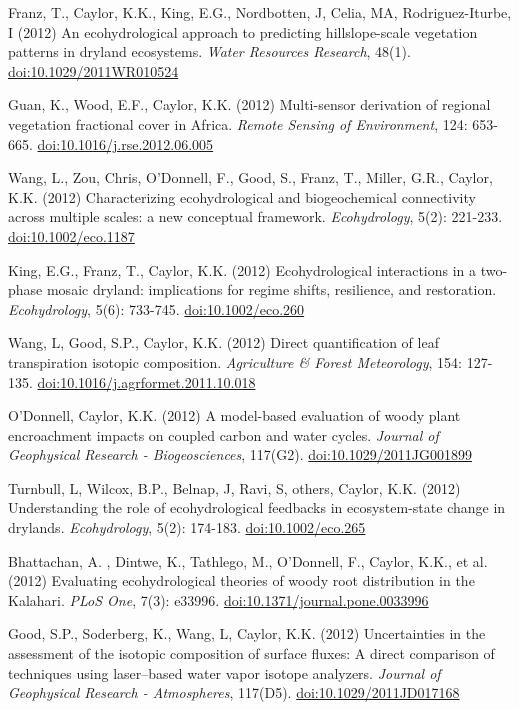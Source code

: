 \begin{etaremune}
\item Franz, T., Caylor, K.K., King, E.G., Nordbotten, J, Celia, MA, Rodriguez-Iturbe, I (2012) An ecohydrological approach to predicting hillslope-scale vegetation patterns in dryland ecosystems. \emph{Water Resources Research}, 48(1). \href{https://doi.org/10.1029/2011WR010524}{doi:10.1029/2011WR010524}
\item Guan, K., Wood, E.F., Caylor, K.K. (2012) Multi-sensor derivation of regional vegetation fractional cover in Africa. \emph{Remote Sensing of Environment}, 124: 653-665. \href{https://doi.org/10.1016/j.rse.2012.06.005}{doi:10.1016/j.rse.2012.06.005}
\item Wang, L., Zou, Chris, O'Donnell, F., Good, S., Franz, T., Miller, G.R., Caylor, K.K. (2012) Characterizing ecohydrological and biogeochemical connectivity across multiple scales: a new conceptual framework. \emph{Ecohydrology}, 5(2): 221-233. \href{https://doi.org/10.1002/eco.1187}{doi:10.1002/eco.1187}
\item King, E.G., Franz, T., Caylor, K.K. (2012) Ecohydrological interactions in a two-phase mosaic dryland: implications for regime shifts, resilience, and restoration. \emph{Ecohydrology}, 5(6): 733-745. \href{https://doi.org/10.1002/eco.260}{doi:10.1002/eco.260}
\item Wang, L, Good, S.P., Caylor, K.K. (2012) Direct quantification of leaf transpiration isotopic composition. \emph{Agriculture \& Forest Meteorology}, 154: 127-135. \href{https://doi.org/10.1016/j.agrformet.2011.10.018}{doi:10.1016/j.agrformet.2011.10.018}
\item O'Donnell, Caylor, K.K. (2012) A model-based evaluation of woody plant encroachment impacts on coupled carbon and water cycles. \emph{Journal of Geophysical Research - Biogeosciences}, 117(G2). \href{https://doi.org/10.1029/2011JG001899}{doi:10.1029/2011JG001899}
\item Turnbull, L, Wilcox, B.P., Belnap, J, Ravi, S, others, Caylor, K.K. (2012) Understanding the role of ecohydrological feedbacks in ecosystem-state change in drylands. \emph{Ecohydrology}, 5(2): 174-183. \href{https://doi.org/10.1002/eco.265}{doi:10.1002/eco.265}
\item Bhattachan, A. , Dintwe, K., Tathlego, M., O'Donnell, F., Caylor, K.K., et al. (2012) Evaluating ecohydrological theories of woody root distribution in the Kalahari. \emph{PLoS One}, 7(3): e33996. \href{https://doi.org/10.1371/journal.pone.0033996}{doi:10.1371/journal.pone.0033996}
\item Good, S.P., Soderberg, K., Wang, L, Caylor, K.K. (2012) Uncertainties in the assessment of the isotopic composition of surface fluxes: A direct comparison of techniques using laser--based water vapor isotope analyzers. \emph{Journal of Geophysical Research - Atmospheres}, 117(D5). \href{https://doi.org/10.1029/2011JD017168}{doi:10.1029/2011JD017168}

\end{etaremune}
